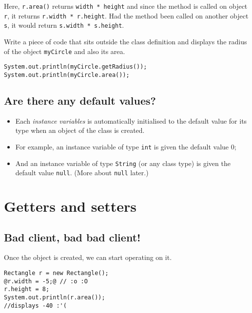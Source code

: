   \vskip 0.5cm
  
  
  Here, \texttt{r.area()} returns \texttt{width * height} and since the method is called on object \texttt{r}, it returns \texttt{r.width * r.height}. Had the method been called on another object \texttt{s}, it would return \texttt{s.width * s.height}.
  
\begin{exercise}
Write a piece of code that sits outside the class definition and displays the radius of the object \texttt{myCircle} and also its area.
\end{exercise}
\begin{answer} \begin{lstlisting}
System.out.println(myCircle.getRadius());
System.out.println(myCircle.area());
\end{lstlisting} \end{answer}

\subsection{Are there any default values?}

    \begin{itemize}
    \item Each {\em instance variables}	
          is automatically initialised to the default value for its type when an object of
          the class is created. 
    \item For example, an instance variable
          of type \lstinline!int! is given the default value 0;
    \item And an instance variable
          of type \lstinline!String! (or any class type)
          is given the default value \lstinline!null!.
          (More about \lstinline!null! later.)
    \end{itemize}

\section{Getters and setters}
\subsection{Bad client, bad bad client!}

Once the object is created, we can start operating on it.
\begin{lstlisting}[style=buggy]
Rectangle r = new Rectangle();
@r.width = -5;@ // :o :O
r.height = 8;
System.out.println(r.area()); 
//displays -40 :'(
\end{lstlisting}

